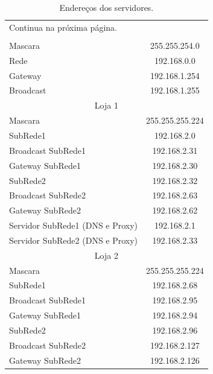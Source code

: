 \documentclass[a4paper,12pt]{article}
\begin{document}
\begin{center}
\begin{longtable}{ l | c }
   \caption{Endereços dos servidores.} \label{grid_mlmmh} \\
   \toprule
   \endfirsthead

   \endhead

   \multicolumn{2}{l}{ Continua na próxima página. } \\
   \endfoot

   \bottomrule
   \endlastfoot

   \multicolumn{2}{c}{Rede Edifício Sede} \\\hline 
   Mascara & 255.255.254.0 \\\hline
   Rede & 192.168.0.0 \\\hline 
   Gateway & 192.168.1.254 \\\hline
   Broadcast & 192.168.1.255 \\\hline 

   \multicolumn{2}{c}{Loja 1} \\\hline 
   Mascara & 255.255.255.224 \\\hline

   SubRede1 & 192.168.2.0 \\\hline 
   Broadcast SubRede1 & 192.168.2.31 \\\hline
   Gateway SubRede1 & 192.168.2.30 \\\hline

   SubRede2 & 192.168.2.32 \\\hline 
   Broadcast SubRede2 & 192.168.2.63 \\\hline
   Gateway SubRede2 & 192.168.2.62 \\\hline

   Servidor SubRede1 (DNS e Proxy) & 192.168.2.1 \\\hline
   Servidor SubRede2 (DNS e Proxy) & 192.168.2.33 \\\hline

   \multicolumn{2}{c}{Loja 2} \\\hline 
   Mascara & 255.255.255.224 \\\hline

   SubRede1 & 192.168.2.68 \\\hline 
   Broadcast SubRede1 & 192.168.2.95 \\\hline
   Gateway SubRede1 & 192.168.2.94 \\\hline

   SubRede2 & 192.168.2.96\\\hline 
   Broadcast SubRede2 & 192.168.2.127 \\\hline
   Gateway SubRede2 & 192.168.2.126\\\hline


\end{longtable}
\end{center}
\end{document}
